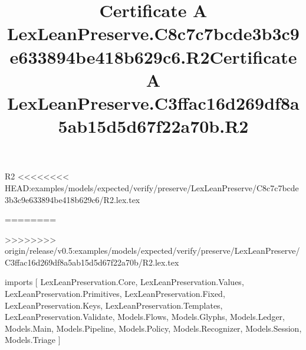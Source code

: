 \begin{lexlean}{R2}
<<<<<<<< HEAD:examples/models/expected/verify/preserve/LexLeanPreserve/C8c7c7bcde3b3c9e633894be418b629c6/R2.lex.tex
\title{Certificate A LexLeanPreserve.C8c7c7bcde3b3c9e633894be418b629c6.R2}
========
\title{Certificate A LexLeanPreserve.C3ffac16d269df8a5ab15d5d67f22a70b.R2}
>>>>>>>> origin/release/v0.5:examples/models/expected/verify/preserve/LexLeanPreserve/C3ffac16d269df8a5ab15d5d67f22a70b/R2.lex.tex
\begin{coremodule}
imports [
  LexLeanPreservation.Core,
  LexLeanPreservation.Values,
  LexLeanPreservation.Primitives,
  LexLeanPreservation.Fixed,
  LexLeanPreservation.Keys,
  LexLeanPreservation.Templates,
  LexLeanPreservation.Validate,
  Models.Flows,
  Models.Glyphs,
  Models.Ledger,
  Models.Main,
  Models.Pipeline,
  Models.Policy,
  Models.Recognizer,
  Models.Session,
  Models.Triage
]


\end{coremodule}
\end{lexlean}

